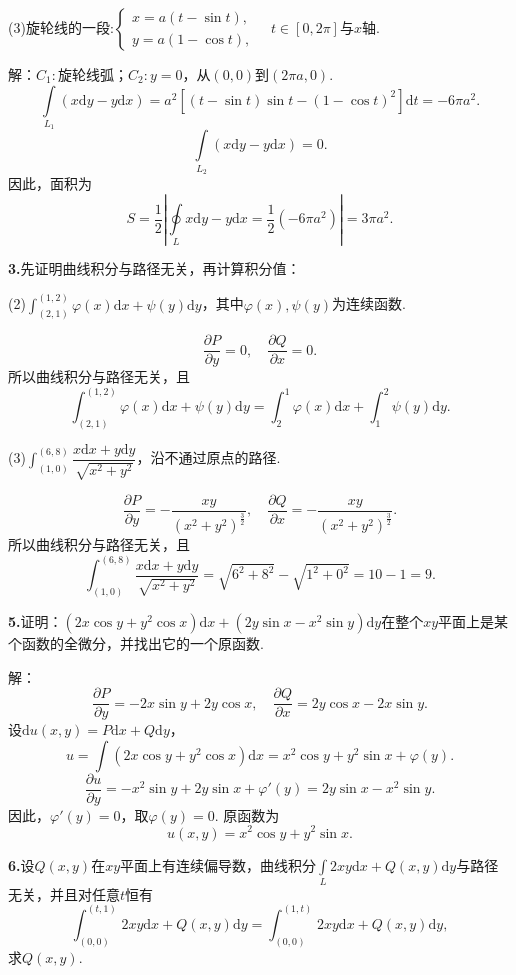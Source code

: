 \documentclass[12pt, a4paper]{article}
\newcommand{\dif}{\mathrm{d}}
\begin{document}
(3)旋轮线的一段:\(\begin{cases}
x = a(t - \sin t), \\
y = a(1 - \cos t),
\end{cases} \quad t \in [0, 2\pi]\)与\(x\)轴.

解：\(C_1:\)旋轮线弧；\(C_2:y = 0\)，从\((0, 0)\)到\((2\pi a, 0)\). 
\[\int\limits_{L_1} (x \dif y - y \dif x) = a^2[(t - \sin t)\sin t - (1 - \cos t)^2] \dif t = -6\pi a^2.\]
\[\int\limits_{L_2} (x \dif y - y \dif x) = 0.\]
因此，面积为
\[S = \frac{1}{2}\left|\oint\limits_L x \dif y - y \dif x = \frac{1}{2}(-6\pi a^2)\right| = 3\pi a^2.\]

\textbf{3.}先证明曲线积分与路径无关，再计算积分值：

(2)\(\int_{(2, 1)}^{(1, 2)} \varphi(x) \dif x + \psi(y) \dif y\)，其中\(\varphi(x), \psi(y)\)为连续函数.

\[\frac{\partial P}{\partial y} = 0, \quad \frac{\partial Q}{\partial x} = 0.\]
所以曲线积分与路径无关，且
\[\int_{(2, 1)}^{(1, 2)} \varphi(x) \dif x + \psi(y) \dif y = \int_2^1 \varphi(x) \dif x + \int_1^2 \psi(y) \dif y.\]

(3)\(\int_{(1, 0)}^{(6, 8)} \dfrac{x \dif x + y \dif y}{\sqrt{x^2 + y^2}}\)，沿不通过原点的路径.

\[\frac{\partial P}{\partial y} = -\frac{xy}{(x^2 + y^2)^{\frac{3}{2}}}, \quad \frac{\partial Q}{\partial x} = -\frac{xy}{(x^2 + y^2)^{\frac{3}{2}}}.\]
所以曲线积分与路径无关，且
\[\int_{(1, 0)}^{(6, 8)} \dfrac{x \dif x + y \dif y}{\sqrt{x^2 + y^2}} = \sqrt{6^2 + 8^2} - \sqrt{1^2 + 0^2} = 10 - 1 = 9.\]

\textbf{5.}证明：\((2x\cos y + y^2\cos x) \dif x + (2y\sin x - x^2\sin y) \dif y\)在整个\(xy\)平面上是某个函数的全微分，并找出它的一个原函数.

解：
\[\frac{\partial P}{\partial y} = -2x\sin y + 2y\cos x, \quad \frac{\partial Q}{\partial x} = 2y\cos x - 2x\sin y.\]
设\(\dif u(x, y) = P \dif x + Q \dif y\)，
\[u = \int (2x\cos y + y^2\cos x) \dif x = x^2\cos y + y^2\sin x + \varphi(y).\]
\[\frac{\partial u}{\partial y} = -x^2\sin y + 2y\sin x + \varphi'(y) = 2y\sin x - x^2\sin y.\]
因此，\(\varphi'(y) = 0\)，取\(\varphi(y) = 0\).
原函数为
\[u(x, y) = x^2\cos y + y^2\sin x.\]

\textbf{6.}设\(Q(x, y)\)在\(xy\)平面上有连续偏导数，曲线积分\(\int\limits_L 2xy \dif x + Q(x, y) \dif y\)与路径无关，并且对任意\(t\)恒有
\[\int_{(0, 0)}^{(t, 1)} 2xy \dif x + Q(x, y) \dif y = \int_{(0, 0)}^{(1, t)} 2xy \dif x + Q(x, y) \dif y,\]
求\(Q(x, y)\).
\end{document}
